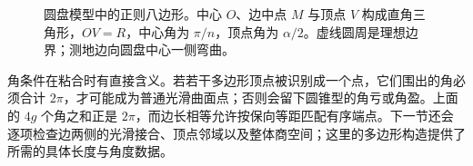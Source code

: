 \begin{figure}[htbp]
	\centering
	
	\caption[正则双曲多边形的直角三角形]{圆盘模型中的正则八边形。中心 \(O\)、边中点 \(M\) 与顶点 \(V\) 构成直角三角形，\(OV=R\)，中心角为 \(\pi/n\)，顶点角为 \(\alpha/2\)。虚线圆周是理想边界；测地边向圆盘中心一侧弯曲。}
	\label{g1:fig:regular-hyperbolic-polygon}
\end{figure}

角条件在粘合时有直接含义。若若干多边形顶点被识别成一个点，它们围出的角必须合计 \(2\pi\)，才可能成为普通光滑曲面点；否则会留下圆锥型的角亏或角盈。上面的 \(4g\) 个角之和正是 \(2\pi\)，而边长相等允许按保向等距匹配有序端点。下一节还会逐项检查边两侧的光滑接合、顶点邻域以及整体商空间；这里的多边形构造提供了所需的具体长度与角度数据。
